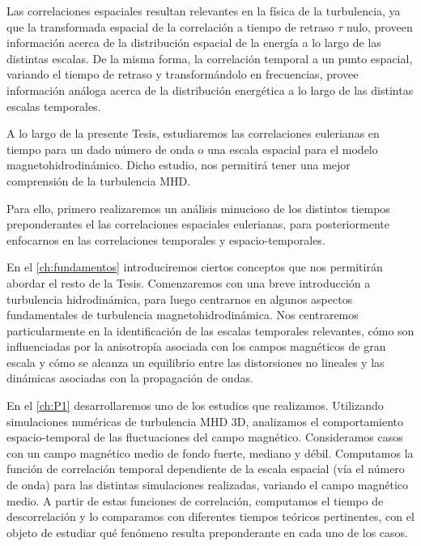 Las correlaciones espaciales resultan relevantes en la física de la
turbulencia, ya que la transformada espacial de la correlación a
tiempo de retraso $\tau$ nulo, proveen información acerca de la
distribución espacial de la energía a lo largo de las distintas
escalas. De la misma forma, la correlación temporal a un punto
espacial, variando el tiempo de retraso y transformándolo en
frecuencias, provee información análoga acerca de la distribución
energética a lo largo de las distintas escalas temporales.

A lo largo de la presente Tesis, estudiaremos las correlaciones
eulerianas en tiempo para un dado número de onda o una escala espacial
para el modelo magnetohidrodinámico. Dicho estudio, nos permitirá
tener una mejor comprensión de la turbulencia MHD.

Para ello, primero realizaremos un análisis minucioso de los distintos
tiempos preponderantes el las correlaciones espaciales eulerianas,
para posteriormente enfocarnos en las correlaciones temporales y
espacio-temporales.



\vspace{3cm}

En el \cref{ch:fundamentos} introduciremos ciertos conceptos que nos
permitirán abordar el resto de la Tesis. Comenzaremos con una breve
introducción a turbulencia hidrodinámica, para luego centrarnos en
algunos aspectos fundamentales de turbulencia
magnetohidrodinámica. Nos centraremos particularmente en la
identificación de las escalas temporales relevantes, cómo son
influenciadas por la anisotropía asociada con los campos magnéticos de
gran escala y cómo se alcanza un equilibrio entre las distorsiones no
lineales y las dinámicas asociadas con la propagación de ondas.

En el \cref{ch:P1} desarrollaremos uno de los estudios que realizamos.
Utilizando simulaciones numéricas de turbulencia MHD 3D, analizamos el
comportamiento espacio-temporal de las fluctuaciones del campo
magnético. Consideramos casos con un campo magnético medio de fondo
fuerte, mediano y débil. Computamos la función de correlación temporal
dependiente de la escala espacial (vía el número de onda) para las
distintas simulaciones realizadas, variando el campo magnético
medio. A partir de estas funciones de correlación, computamos el
tiempo de descorrelación y lo comparamos con diferentes tiempos
teóricos pertinentes, con el objeto de estudiar qué fenómeno resulta
preponderante en cada uno de los casos.


